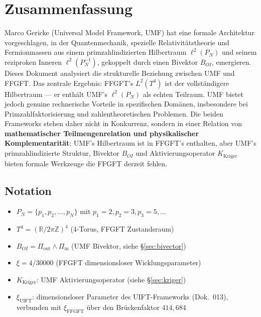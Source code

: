 
\section*{Zusammenfassung}

Marco Gericke (Universal Model Framework, UMF) hat eine formale Architektur
vorgeschlagen, in der Quantenmechanik, spezielle Relativitätstheorie und
Fermionmassen aus einem primzahlindizierten Hilbertraum $\ell^2(P_N)$ und
seinem reziproken Inneren $\ell^2(P_N^{-1})$, gekoppelt durch einen Bivektor
$B_{OI}$, emergieren. Dieses Dokument analysiert die strukturelle Beziehung
zwischen UMF und FFGFT. Das zentrale Ergebnis: FFGFT's $L^2(T^4)$ ist der
vollständigere Hilbertraum — er enthält UMF's $\ell^2(P_N)$ als echten
Teilraum. UMF bietet jedoch genuine rechnerische Vorteile in spezifischen
Domänen, insbesondere bei Primzahlfaktorisierung und zahlentheoretischen
Problemen. Die beiden Frameworks stehen daher nicht in Konkurrenz, sondern in einer Relation von \textbf{mathematischer Teilmengenrelation und physikalischer Komplementarität}: UMF's Hilbertraum ist in FFGFT's enthalten, aber UMF's primzahlindizierte Struktur, Bivektor $B_{OI}$ und Aktivierungsoperator $K_\text{Kriger}$ bieten formale Werkzeuge die FFGFT derzeit fehlen.

\subsection*{Notation}

\begin{itemize}
  \item $P_N = \{p_1, p_2, \dots, p_N\}$ mit $p_1=2, p_2=3, p_3=5, \dots$
  \item $T^4 = (\mathbb{R}/2\pi\mathbb{Z})^4$ (4-Torus, FFGFT Zustandsraum)
  \item $B_{OI} = \Pi_\text{out} \wedge \Pi_\text{in}$ (UMF Bivektor, siehe \S\ref{sec:bivector})
  \item $\xi = 4/30000$ (FFGFT dimensionsloser Wicklungsparameter)
  \item $K_\text{Kriger}$: UMF Aktivierungsoperator (siehe \S\ref{sec:kriger})
  \item $\xi_\text{UIFT}$: dimensionsloser Parameter des UIFT-Frameworks (Dok.~013), verbunden mit $\xi_\text{FFGFT}$ über den Brückenfaktor $414{,}684$
\end{itemize}

